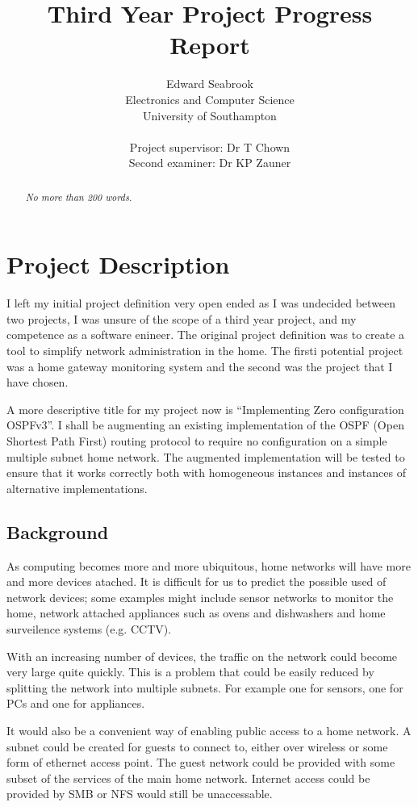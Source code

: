 \documentclass[12pt]{report}
\author{Edward Seabrook \\ 
Electronics and Computer Science \\ 
University of Southampton \\ \\
Project supervisor: Dr T Chown \\
Second examiner: Dr KP Zauner}
\title{Third Year Project Progress Report}
\begin{document}



\begin{abstract}
\em No more than 200 words. \em


\end{abstract}

\tableofcontents
\clearpage
\listoftodos

\chapter{Project Description}

I left my initial project definition very open ended as I was undecided between
two projects, I was unsure of the scope of a third year project, and my
competence as a software enineer. The original project definition was to create
a tool to simplify network administration in the home. The firsti potential
project was a home gateway monitoring system and the second was the project that
I have chosen. 

A more descriptive title for my project now is ``Implementing Zero configuration
OSPFv3''. I shall be augmenting an existing implementation of the OSPF (Open
Shortest Path First) routing protocol to require no configuration on a simple
multiple subnet home network. The augmented implementation will be tested to
ensure that it works correctly both with homogeneous instances and instances of
alternative implementations. 

\section{Background}
As computing becomes more and more ubiquitous, home networks will have more and
more devices atached. It is difficult for us to predict the possible used of
network devices; some examples might include sensor networks to monitor the
home, network attached appliances such as ovens and dishwashers and home
surveilence systems (e.g. CCTV). 

With an increasing number of devices, the traffic on the network could become
very large quite quickly. This is a problem that could be easily reduced by
splitting the network into multiple subnets. For example one for sensors, one
for PCs and one for appliances. 

It would also be a convenient way of enabling public access to a home
network. A subnet could be created for guests to connect to, either over
wireless or some form of ethernet access point. The guest network could be
provided with some subset of the services of the main home network. Internet
access could be provided by SMB or NFS would still be unaccessable.
\end{document}

